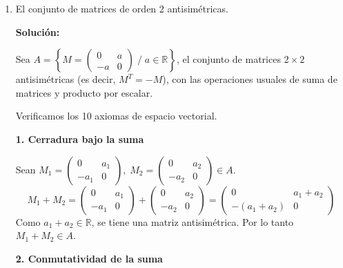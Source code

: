 \documentclass[12pt]{article}
\newcommand{\solucion}{%
    \vspace{0.8em}%
    \textbf{Solución:}%
    \vspace{0.8em}%
}
\begin{document}
\begin{enumerate}[label=\alph*.-]
    Por lo tanto, con esta interpretación más estricta, $\mathcal{P}_3^{*}$ \textbf{no es un espacio vectorial}, ya que no contiene al elemento neutro de la suma ni es cerrado bajo dicha operación.

    \textbf{Conclusión general:} el resultado depende de la interpretación del enunciado. Si "grado 3" se entiende como "grado a lo sumo 3" ($\mathcal{P}_3$), \textbf{sí es un espacio vectorial}. Si se entiende en sentido estricto, exigiendo $a_3\neq 0$ ($\mathcal{P}_3^{*}$), \textbf{no lo es}.

    \item El conjunto de matrices de orden 2 antisimétricas.

    \solucion

    Sea $A = \left\{ M=\begin{pmatrix} 0 & a \\ -a & 0 \end{pmatrix} \; \Big/ \; a \in \mathbb{R} \right\}$, el conjunto de matrices $2\times 2$ antisimétricas (es decir, $M^T=-M$), con las operaciones usuales de suma de matrices y producto por escalar.

    Verificamos los 10 axiomas de espacio vectorial.

    \textbf{1. Cerradura bajo la suma}

    Sean $M_1=\begin{pmatrix}0 & a_1\\ -a_1 & 0\end{pmatrix},\; M_2=\begin{pmatrix}0 & a_2\\ -a_2 & 0\end{pmatrix} \in A$.
    \[
    M_1+M_2 = \begin{pmatrix}0 & a_1\\ -a_1 & 0\end{pmatrix}+\begin{pmatrix}0 & a_2\\ -a_2 & 0\end{pmatrix} = \begin{pmatrix}0 & a_1+a_2\\ -(a_1+a_2) & 0\end{pmatrix}
    \]
    Como $a_1+a_2 \in \mathbb{R}$, se tiene una matriz antisimétrica. Por lo tanto $M_1+M_2 \in A$.

    \textbf{2. Conmutatividad de la suma}


\end{enumerate}
\end{document}
